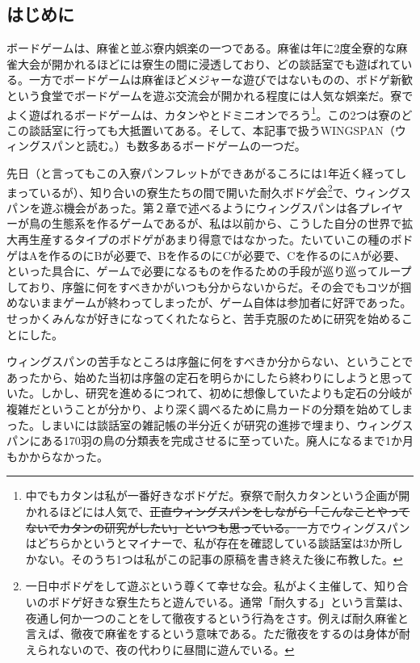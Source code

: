 
\setlength{\abovedisplayskip}{5pt}
\setlength{\belowdisplayskip}{5pt}


\subsection{はじめに}
\begin{multicols}{2}
ボードゲームは、麻雀と並ぶ寮内娯楽の一つである。麻雀は年に2度全寮的な麻雀大会が開かれるほどには寮生の間に浸透しており、どの談話室でも遊ばれている。一方でボードゲームは麻雀ほどメジャーな遊びではないものの、ボドゲ新歓という食堂でボードゲームを遊ぶ交流会が開かれる程度には人気な娯楽だ。寮でよく遊ばれるボードゲームは、カタンやとドミニオンでろう\footnote{中でもカタンは私が一番好きなボドゲだ。寮祭で耐久カタンという企画が開かれるほどには人気で、\sout{正直ウィングスパンをしながら「こんなことやってないでカタンの研究がしたい」といつも思っている。}一方でウィングスパンはどちらかというとマイナーで、私が存在を確認している談話室は3か所しかない。そのうち1つは私がこの記事の原稿を書き終えた後に布教した。}。この2つは寮のどこの談話室に行っても大抵置いてある。そして、本記事で扱うWINGSPAN（ウィングスパンと読む。）も数多あるボードゲームの一つだ。
\par
先日（と言ってもこの入寮パンフレットができあがるころには1年近く経ってしまっているが）、知り合いの寮生たちの間で開いた耐久ボドゲ会\footnote{一日中ボドゲをして遊ぶという尊くて幸せな会。私がよく主催して、知り合いのボドゲ好きな寮生たちと遊んでいる。通常「耐久する」という言葉は、夜通し何か一つのことをして徹夜するという行為をさす。例えば耐久麻雀と言えば、徹夜で麻雀をするという意味である。ただ徹夜をするのは身体が耐えられないので、夜の代わりに昼間に遊んでいる。}で、ウィングスパンを遊ぶ機会があった。第２章で述べるようにウィングスパンは各プレイヤーが鳥の生態系を作るゲームであるが、私は以前から、こうした自分の世界で拡大再生産するタイプのボドゲがあまり得意ではなかった。たいていこの種のボドゲはAを作るのにBが必要で、Bを作るのにCが必要で、Cを作るのにAが必要、といった具合に、ゲームで必要になるものを作るための手段が巡り巡ってループしており、序盤に何をすべきかがいつも分からないからだ。その会でもコツが掴めないままゲームが終わってしまったが、ゲーム自体は参加者に好評であった。せっかくみんなが好きになってくれたならと、苦手克服のために研究を始めることにした。
\par
ウィングスパンの苦手なところは序盤に何をすべきか分からない、ということであったから、始めた当初は序盤の定石を明らかにしたら終わりにしようと思っていた。しかし、研究を進めるにつれて、初めに想像していたよりも定石の分岐が複雑だということが分かり、より深く調べるために鳥カードの分類を始めてしまった。しまいには談話室の雑記帳の半分近くが研究の進捗で埋まり、ウィングスパンにある170羽の鳥の分類表を完成させるに至っていた。廃人になるまで1か月もかからなかった。

\end{multicols}
